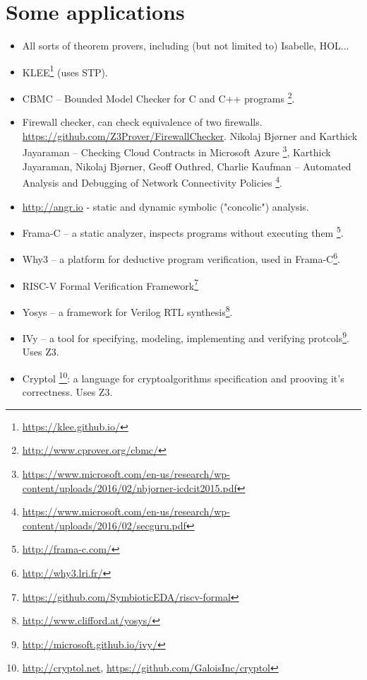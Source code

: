 \chapter{Some applications}

\begin{itemize}
\item All sorts of theorem provers, including (but not limited to) Isabelle, HOL...

\item KLEE\footnote{\url{https://klee.github.io/}} (uses STP).

\item CBMC -- Bounded Model Checker for C and C++ programs
\footnote{\url{http://www.cprover.org/cbmc/}}.

\item Firewall checker, can check equivalence of two firewalls.
\url{https://github.com/Z3Prover/FirewallChecker}.
Nikolaj Bjørner and Karthick Jayaraman -- Checking Cloud Contracts in Microsoft Azure
\footnote{\url{https://www.microsoft.com/en-us/research/wp-content/uploads/2016/02/nbjorner-icdcit2015.pdf}},
Karthick Jayaraman, Nikolaj Bjørner, Geoff Outhred, Charlie Kaufman -- Automated Analysis and Debugging of Network Connectivity Policies
\footnote{\url{https://www.microsoft.com/en-us/research/wp-content/uploads/2016/02/secguru.pdf}}.

\item \url{http://angr.io} - static and dynamic symbolic ("concolic") analysis.

\item Frama-C -- a static analyzer, inspects programs without executing them
\footnote{\url{http://frama-c.com/}}.

\item Why3 -- a platform for deductive program verification,
used in Frama-C\footnote{\url{http://why3.lri.fr/}}.

\item RISC-V Formal Verification Framework\footnote{\url{https://github.com/SymbioticEDA/riscv-formal}}

\item Yosys -- a framework for Verilog RTL synthesis\footnote{\url{http://www.clifford.at/yosys/}}.

\item IVy -- a tool for specifying, modeling, implementing and verifying protcols\footnote{\url{http://microsoft.github.io/ivy/}}. Uses Z3.

\item Cryptol
\footnote{\url{http://cryptol.net}, \url{https://github.com/GaloisInc/cryptol}}:
a language for cryptoalgorithms specification and prooving it's correctness. Uses Z3.

\end{itemize}


